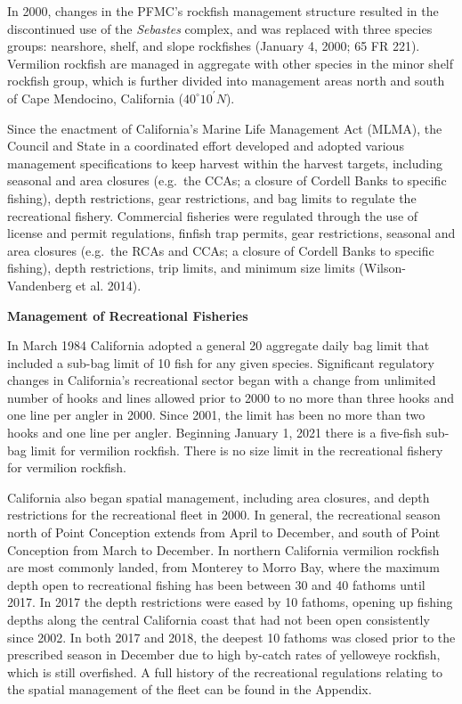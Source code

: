 \documentclass[11pt,
  english,
  a4paper,
]{article}
\begin{document}
In 2000, changes in the PFMC's rockfish management structure resulted in the discontinued use of the \emph{Sebastes} complex, and was replaced with three species groups: nearshore, shelf, and slope rockfishes (January 4, 2000; 65 FR 221). Vermilion rockfish are managed in aggregate with other species in the minor shelf rockfish group, which is further divided into management areas north and south of Cape Mendocino, California ($40^\circ 10^\prime N$).

Since the enactment of California's Marine Life Management Act (MLMA), the Council and State in a coordinated effort developed and adopted various management specifications to keep harvest within the harvest targets, including seasonal and area closures (e.g.~the CCAs; a closure of Cordell Banks to specific fishing), depth restrictions, gear restrictions, and bag limits to regulate the recreational fishery. Commercial fisheries were regulated through the use of license and permit regulations, finfish trap permits, gear restrictions, seasonal and area closures (e.g.~the RCAs and CCAs; a closure of Cordell Banks to specific fishing), depth restrictions, trip limits, and minimum size limits {(Wilson-Vandenberg et al. 2014)\leavevmode\tagmcend\tagstructend}.

\textbf{Management of Recreational Fisheries}

In March 1984 California adopted a general 20 aggregate daily bag limit that included a sub-bag limit of 10 fish for any given species. Significant regulatory changes in California's recreational sector began with a change from unlimited number of hooks and lines allowed prior to 2000 to no more than three hooks and one line per angler in 2000. Since 2001, the limit has been no more than two hooks and one line per angler. Beginning January 1, 2021 there is a five-fish sub-bag limit for vermilion rockfish. There is no size limit in the recreational fishery for vermilion rockfish.

California also began spatial management, including area closures, and depth restrictions for the recreational fleet in 2000. In general, the recreational season north of Point Conception extends from April to December, and south of Point Conception from March to December. In northern California vermilion rockfish are most commonly landed, from Monterey to Morro Bay, where the maximum depth open to recreational fishing has been between 30 and 40 fathoms until 2017. In 2017 the depth restrictions were eased by 10 fathoms, opening up fishing depths along the central California coast that had not been open consistently since 2002. In both 2017 and 2018, the deepest 10 fathoms was closed prior to the prescribed season in December due to high by-catch rates of yelloweye rockfish, which is still overfished. A full history of the recreational regulations relating to the spatial management of the fleet can be found in the Appendix.
\end{document}
